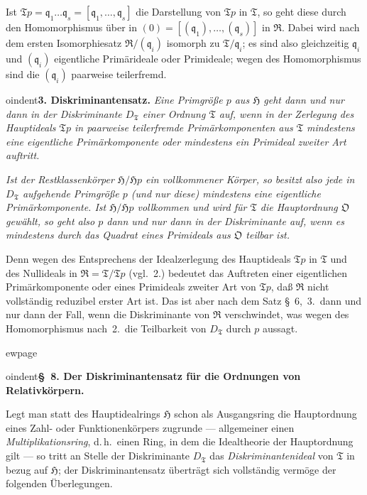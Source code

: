 \documentclass[12pt,a4paper]{article}
\newcommand{\mf}[1]{\mathfrak{#1}}     %
\newcommand{\idealq}{\mathfrak{q}}
\newcommand{\HH}{\mathfrak{H}}          %
\newcommand{\TT}{\mathfrak{T}}          %
\theoremstyle{definition}
\begin{document}
Ist $\TT p = \idealq_1 \dots \idealq_s = [\idealq_1,\dots,\idealq_s]$ die
Darstellung von $\TT p$ in $\TT$, so geht diese durch den Homomorphismus
\"uber in $(0) = [(\idealq_1),\dots,(\idealq_s)]$ in $\mf{R}$. Dabei wird
nach dem ersten Isomorphiesatz $\mf{R}/(\idealq_i)$ isomorph zu
$\TT/\idealq_i$; es sind also gleichzeitig $\idealq_i$ und $(\idealq_i)$
eigentliche Prim\"arideale oder Primideale; wegen des Homomorphismus sind
die $(\idealq_i)$ paarweise teilerfremd.

\medskip



oindent\textbf{3. Diskriminantensatz.} \textit{Eine Primgr\"o\ss e $p$ aus
$\HH$ geht dann und nur dann in der Diskriminante $D_{\TT}$ einer Ordnung
$\TT$ auf, wenn in der Zerlegung des Hauptideals $\TT p$ in paarweise
teilerfremde Prim\"arkomponenten aus $\TT$ mindestens eine eigentliche
Prim\"arkomponente oder mindestens ein Primideal zweiter Art
auftritt.}

\textit{Ist der Restklassenk\"orper $\HH/\HH p$ ein vollkommener K\"orper, so
besitzt also jede in $D_{\TT}$ aufgehende Primgr\"o\ss e $p$ (und nur diese)
mindestens eine eigentliche Prim\"arkomponente. Ist $\HH/\HH p$ vollkommen
und wird f\"ur $\TT$ die Hauptordnung $\mathfrak{O}$ gew\"ahlt, so geht also
$p$ dann und nur dann in der Diskriminante auf, wenn es mindestens durch
das Quadrat eines Primideals aus $\mathfrak{O}$ teilbar ist.}

Denn wegen des Entsprechens der Idealzerlegung des Hauptideals $\TT p$ in
$\TT$ und des Nullideals in $\mf{R} = \TT/\TT p$ (vgl.~2.) bedeutet das
Auftreten einer eigentlichen Prim\"arkomponente oder eines Primideals
zweiter Art von $\TT p$, da\ss{} $\mf{R}$ nicht vollst\"andig reduzibel
erster Art ist. Das ist aber nach dem Satz \S~6,~3.\ dann und nur dann der
Fall, wenn die Diskriminante von $\mf{R}$ verschwindet, was wegen des
Homomorphismus nach~2.\ die Teilbarkeit von $D_{\TT}$ durch $p$ aussagt.



ewpage
\setcounter{page}{562}



oindent\textbf{\S~8. Der Diskriminantensatz f\"ur die Ordnungen von
Relativk\"orpern.}

Legt man statt des Hauptidealrings $\HH$ schon als Ausgangsring die
Hauptordnung eines Zahl- oder Funktionenk\"orpers zugrunde --- allgemeiner
einen \textit{Multiplikationsring}, d.\,h.\ einen Ring, in dem die Idealtheorie
der Hauptordnung gilt --- so tritt an Stelle der Diskriminante $D_{\TT}$
das \textit{Diskriminantenideal} von $\TT$ in bezug auf $\HH$; der
Diskriminantensatz \"ubertr\"agt sich vollst\"andig verm\"oge der folgenden
\"Uberlegungen.
\end{document}
